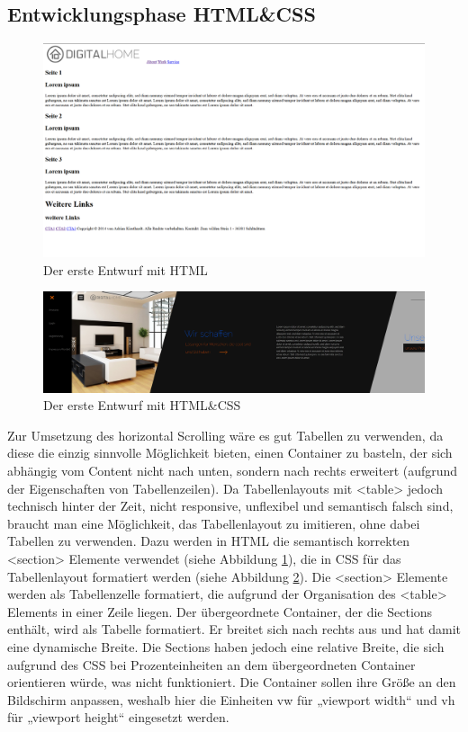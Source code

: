 	\subsection{Entwicklungsphase HTML\&CSS}
\begin{figure} [tp]
\includegraphics[width=\textwidth]{./img/inno_comp2.png}
\caption{Der erste Entwurf mit HTML}
\label{inno_Comp2}
\end{figure}
\begin{figure} [tp]
\includegraphics[width=\textwidth]{./img/inno_comp3.png}
\caption{Der erste Entwurf mit HTML\&CSS}
\label{inno_Comp3}
\end{figure}

Zur Umsetzung des horizontal Scrolling wäre es gut Tabellen zu verwenden, da diese die einzig sinnvolle Möglichkeit bieten, einen Container zu basteln, der sich abhängig vom Content nicht nach unten, sondern nach rechts erweitert (aufgrund der Eigenschaften von Tabellenzeilen). Da Tabellenlayouts mit <table> jedoch technisch hinter der Zeit, nicht responsive, unflexibel und semantisch falsch sind, braucht man eine Möglichkeit, das Tabellenlayout zu imitieren, ohne dabei Tabellen zu verwenden. Dazu werden in HTML die semantisch korrekten <section> Elemente verwendet (siehe Abbildung \ref{inno_Comp2}), die in CSS für das Tabellenlayout formatiert werden (siehe Abbildung \ref{inno_Comp3}). Die <section> Elemente werden als Tabellenzelle formatiert, die aufgrund der Organisation des <table> Elements in einer Zeile liegen. Der übergeordnete Container, der die Sections enthält, wird als Tabelle formatiert. Er breitet sich nach rechts aus und hat damit eine dynamische Breite. Die Sections haben jedoch eine relative Breite, die sich aufgrund des CSS bei Prozenteinheiten an dem übergeordneten Container orientieren würde, was nicht funktioniert. Die Container sollen ihre Größe an den Bildschirm anpassen, weshalb hier die Einheiten vw für „viewport width“ und vh für „viewport height“ eingesetzt werden.

